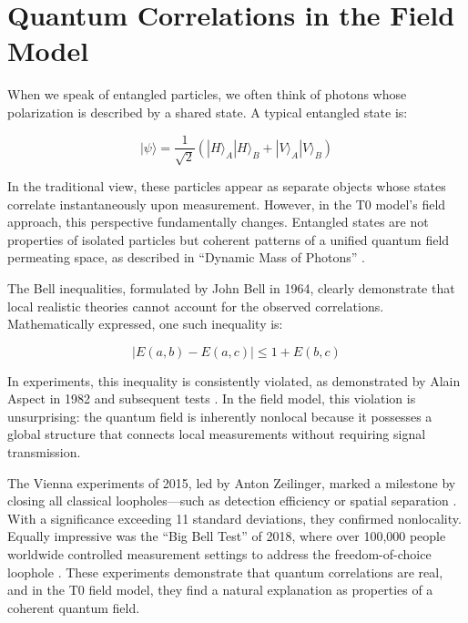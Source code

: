\documentclass[a4paper,12pt]{article}
\theoremstyle{definition}
\theoremstyle{remark}
\begin{document}
	\section{Quantum Correlations in the Field Model}
	
	When we speak of entangled particles, we often think of photons whose polarization is described by a shared state. A typical entangled state is:
	
	\begin{equation}
		|\psi\rangle = \frac{1}{\sqrt{2}} (|H\rangle_A |H\rangle_B + |V\rangle_A |V\rangle_B)
	\end{equation}
	
	In the traditional view, these particles appear as separate objects whose states correlate instantaneously upon measurement. However, in the T0 model’s field approach, this perspective fundamentally changes. Entangled states are not properties of isolated particles but coherent patterns of a unified quantum field permeating space, as described in “Dynamic Mass of Photons” \cite{pascher_photons_2025}.
	
	The Bell inequalities, formulated by John Bell in 1964, clearly demonstrate that local realistic theories cannot account for the observed correlations. Mathematically expressed, one such inequality is:
	
	\begin{equation}
		|E(a,b) - E(a,c)| \leq 1 + E(b,c)
	\end{equation}
	
	In experiments, this inequality is consistently violated, as demonstrated by Alain Aspect in 1982 and subsequent tests \cite{Aspect1982}. In the field model, this violation is unsurprising: the quantum field is inherently nonlocal because it possesses a global structure that connects local measurements without requiring signal transmission.
	
	The Vienna experiments of 2015, led by Anton Zeilinger, marked a milestone by closing all classical loopholes—such as detection efficiency or spatial separation \cite{Giustina2015}. With a significance exceeding 11 standard deviations, they confirmed nonlocality. Equally impressive was the “Big Bell Test” of 2018, where over 100,000 people worldwide controlled measurement settings to address the freedom-of-choice loophole \cite{BigBellTest2018}. These experiments demonstrate that quantum correlations are real, and in the T0 field model, they find a natural explanation as properties of a coherent quantum field.
	
\end{document}
